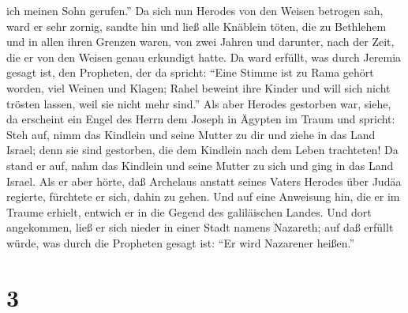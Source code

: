 ich meinen Sohn gerufen.''  Da sich nun Herodes von den
Weisen betrogen sah, ward er sehr zornig, sandte hin und ließ alle
Knäblein töten, die zu Bethlehem und in allen ihren Grenzen waren, von
zwei Jahren und darunter, nach der Zeit, die er von den Weisen genau
erkundigt hatte.  Da ward erfüllt, was durch Jeremia
gesagt ist, den Propheten, der da spricht:  ``Eine Stimme
ist zu Rama gehört worden, viel Weinen und Klagen; Rahel beweint ihre
Kinder und will sich nicht trösten lassen, weil sie nicht mehr sind.''
 Als aber Herodes gestorben war, siehe, da erscheint ein
Engel des Herrn dem Joseph in Ägypten im Traum  und
spricht: Steh auf, nimm das Kindlein und seine Mutter zu dir und ziehe
in das Land Israel; denn sie sind gestorben, die dem Kindlein nach dem
Leben trachteten!  Da stand er auf, nahm das Kindlein und
seine Mutter zu sich und ging in das Land Israel.  Als er
aber hörte, daß Archelaus anstatt seines Vaters Herodes über Judäa
regierte, fürchtete er sich, dahin zu gehen. Und auf eine Anweisung hin,
die er im Traume erhielt, entwich er in die Gegend des galiläischen
Landes.  Und dort angekommen, ließ er sich nieder in
einer Stadt namens Nazareth; auf daß erfüllt würde, was durch die
Propheten gesagt ist: ``Er wird Nazarener heißen.''

\hypertarget{section-2}{%
\section{3}\label{section-2}}

